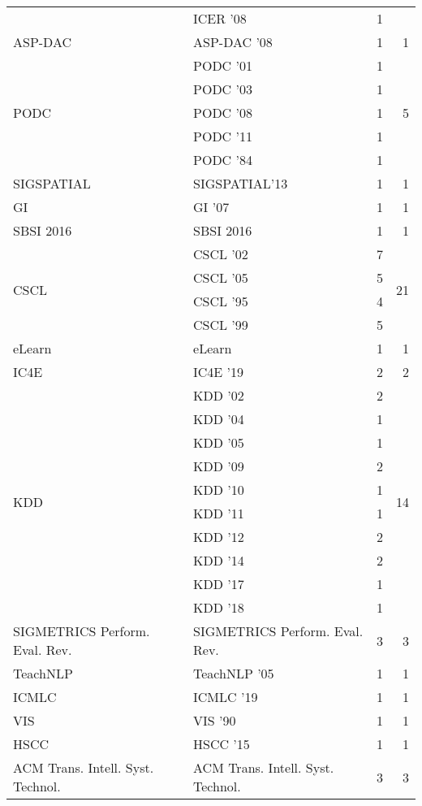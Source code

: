 \begin{table*}[t]
\begin{tabular}{llrr}
& ICER '08 & 1 &\\
\multirow{1}{*}{ASP-DAC } & ASP-DAC '08 & 1 & \multirow{1}{*}{1}\\
\multirow{5}{*}{PODC } & PODC '01 & 1 & \multirow{5}{*}{5}\\
& PODC '03 & 1 &\\
& PODC '08 & 1 &\\
& PODC '11 & 1 &\\
& PODC '84 & 1 &\\
\multirow{1}{*}{SIGSPATIAL} & SIGSPATIAL'13 & 1 & \multirow{1}{*}{1}\\
\multirow{1}{*}{GI } & GI '07 & 1 & \multirow{1}{*}{1}\\
\multirow{1}{*}{SBSI 2016} & SBSI 2016 & 1 & \multirow{1}{*}{1}\\
\multirow{4}{*}{CSCL } & CSCL '02 & 7 & \multirow{4}{*}{21}\\
& CSCL '05 & 5 &\\
& CSCL '95 & 4 &\\
& CSCL '99 & 5 &\\
\multirow{1}{*}{eLearn} & eLearn & 1 & \multirow{1}{*}{1}\\
\multirow{1}{*}{IC4E } & IC4E '19 & 2 & \multirow{1}{*}{2}\\
\multirow{10}{*}{KDD } & KDD '02 & 2 & \multirow{10}{*}{14}\\
& KDD '04 & 1 &\\
& KDD '05 & 1 &\\
& KDD '09 & 2 &\\
& KDD '10 & 1 &\\
& KDD '11 & 1 &\\
& KDD '12 & 2 &\\
& KDD '14 & 2 &\\
& KDD '17 & 1 &\\
& KDD '18 & 1 &\\
\multirow{1}{*}{SIGMETRICS Perform. Eval. Rev.} & SIGMETRICS Perform. Eval. Rev. & 3 & \multirow{1}{*}{3}\\
\multirow{1}{*}{TeachNLP } & TeachNLP '05 & 1 & \multirow{1}{*}{1}\\
\multirow{1}{*}{ICMLC } & ICMLC '19 & 1 & \multirow{1}{*}{1}\\
\multirow{1}{*}{VIS } & VIS '90 & 1 & \multirow{1}{*}{1}\\
\multirow{1}{*}{HSCC } & HSCC '15 & 1 & \multirow{1}{*}{1}\\
\multirow{1}{*}{ACM Trans. Intell. Syst. Technol.} & ACM Trans. Intell. Syst. Technol. & 3 & \multirow{1}{*}{3}\\

\end{tabular}
\end{table*}
